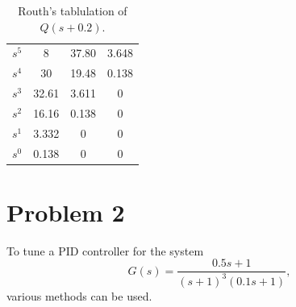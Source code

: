 \documentclass[10pt,a4paper]{article}
\begin{document}
        \begin{table}[h]
            \centering
            \begin{tabular}{ c | c c c}
                $s^5$ & 8     & 37.80 & 3.648 \\
                $s^4$ & 30    & 19.48 & 0.138 \\
                $s^3$ & 32.61 & 3.611 & 0     \\
                $s^2$ & 16.16 & 0.138 & 0     \\
                $s^1$ & 3.332 & 0     & 0     \\
                $s^0$ & 0.138 & 0     & 0             
            \end{tabular}
            \caption{Routh's tablulation of $Q(s + 0.2)$.}
            \label{tb:rouths_Qc}
        \end{table}

    \section{Problem 2}
        To tune a PID controller for the system
        \begin{equation} \label{eq:problem2}
            G(s) = \frac{0.5s + 1}{(s + 1)^3( 0.1s + 1)},
        \end{equation}
        various methods can be used.
\end{document}
